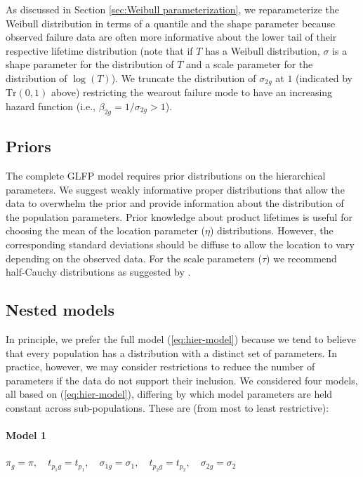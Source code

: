\documentclass[12pt]{article}
\begin{document}
As discussed in Section \ref{sec:Weibull parameterization}, we reparameterize the Weibull distribution in terms of a quantile and the shape parameter because observed failure data are often more informative about the lower tail of their respective lifetime distribution (note that if $T$ has a Weibull distribution, $\sigma$ is a shape parameter for the distribution of $T$ and a scale parameter for the distribution of $\log(T)$). We truncate the distribution of $\sigma_{2g}$ at $1$ (indicated by $\text{Tr}(0,1)$ above) restricting the wearout failure mode to have an increasing hazard function (i.e., $\beta_{2g} = 1/\sigma_{2g}>1$). %

\subsection{Priors}
The complete GLFP model requires prior distributions on the hierarchical parameters.  We suggest weakly informative proper distributions that allow the data to overwhelm the prior and provide information about the distribution of the population parameters.  Prior knowledge about product lifetimes is useful for choosing the mean of the location parameter ($\eta$) distributions.  However, the corresponding standard deviations should be diffuse to allow the location to vary depending on the observed data.  For the scale parameters ($\tau$) we recommend half-Cauchy distributions as suggested by \citet{gelman2014bayesian}.  

\subsection{Nested models}
In principle, we prefer the full model (\ref{eq:hier-model}) because we tend to believe that every population has a distribution with a distinct set of parameters. In practice, however, we may consider restrictions to reduce the number of parameters if the data do not support their inclusion.  We considered four models, all based on (\ref{eq:hier-model}), differing by which model parameters are held constant across sub-populations. These are (from most to least restrictive):

\paragraph{Model 1} $\pi_{g} = \pi,\quad t_{p_{1}g} = t_{p_1},\quad \sigma_{1g}=\sigma_1,\quad t_{p_{2}g} = t_{p_2},\quad \sigma_{2g} = \sigma_2$
\end{document}
